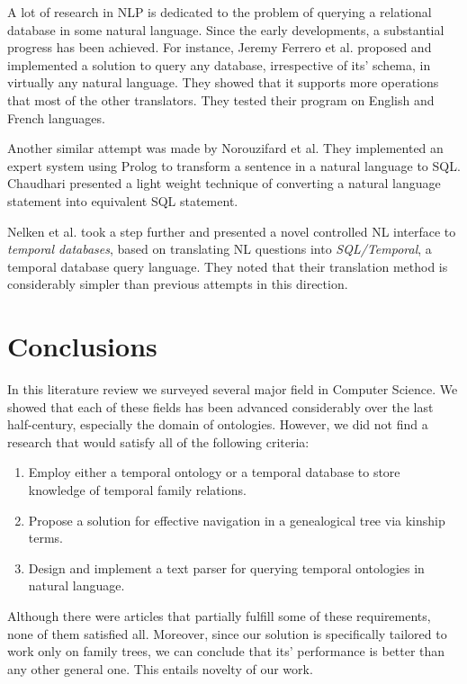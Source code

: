 A lot of research in NLP is dedicated to the problem of querying a relational database in some natural language. Since the early
developments, a substantial progress has been achieved. For instance, Jeremy Ferrero et al. proposed and implemented \cite{fr2sql}
a solution to query any database, irrespective of its' schema, in virtually any natural language. They showed that it supports
more operations that most of the other translators. They tested their program on English and French languages.

Another similar attempt was made \cite{not} by Norouzifard et al. They implemented an expert system using Prolog to transform a
sentence in a natural language to SQL. Chaudhari \cite{chaudhari} presented a light weight technique of converting a natural
language statement into equivalent SQL statement.

Nelken et al. took \cite{nelken} a step further and presented a novel controlled NL interface to \textit{temporal databases}, based on
translating NL questions into \textit{SQL/Temporal}, a temporal database query language. They noted that their translation method
is considerably simpler than previous attempts in this direction.

\section{Conclusions}
In this literature review we surveyed several major field in Computer Science. We showed that each of these fields has been advanced
considerably over the last half-century, especially the domain of ontologies. However, we did not find a research that would
satisfy all of the following criteria:
\begin{enumerate}
    \item{Employ either a temporal ontology or a temporal database to store knowledge of temporal family relations.}
    \item{Propose a solution for effective navigation in a genealogical tree via kinship terms.}
    \item{Design and implement a text parser for querying temporal ontologies in natural language.}
\end{enumerate}
Although there were articles that partially fulfill some of these requirements, none of them satisfied all.
Moreover, since our solution is specifically tailored to work only on family trees, we can conclude that its' performance is
better than any other general one. This entails novelty of our work.
